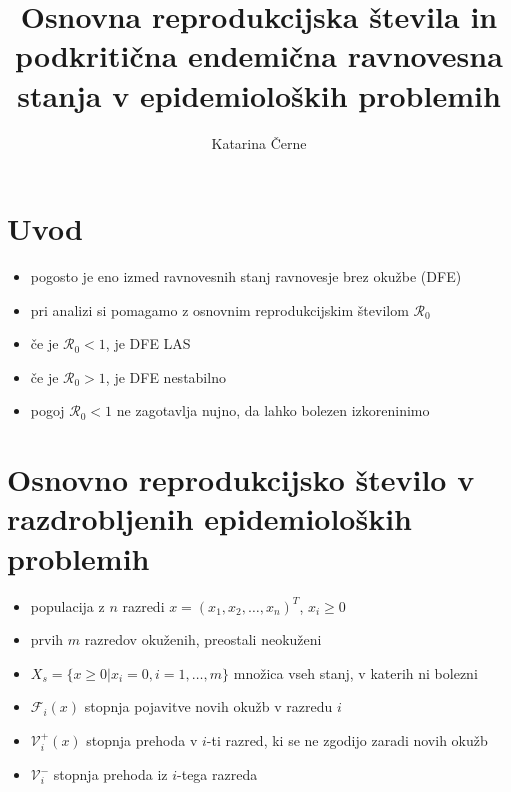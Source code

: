 \documentclass[11pt]{beamer}
\title{Osnovna reprodukcijska števila in podkritična endemična ravnovesna stanja v epidemioloških problemih}
\author{Katarina Černe}
\newcommand{\R}{\mathcal R}
\newcommand{\F}{\mathcal F}
\newcommand{\V}{\mathcal V}
\begin{document}
\begin{frame}
\maketitle
\end{frame}

\section{Uvod}
\begin{frame}
\begin{itemize}
    \item pogosto je eno izmed ravnovesnih stanj ravnovesje brez okužbe (DFE)
    \item pri analizi si pomagamo z osnovnim reprodukcijskim številom \(\R_0\)
    \item če je \(\R_0<1\), je DFE LAS
    \item če je \(\R_0>1\), je DFE nestabilno
    \item pogoj \(\R_0<1\) ne zagotavlja nujno, da lahko bolezen izkoreninimo
\end{itemize}
\end{frame}

\section{Osnovno reprodukcijsko število v razdrobljenih epidemioloških problemih}
\begin{frame}
\begin{itemize}
    \item populacija z \(n\) razredi \(x=(x_1,x_2,\ldots,x_n)^T\), \(x_i\geq 0\)
    \item prvih \(m\) razredov okuženih, preostali neokuženi
    \item \(X_s=\{x\geq 0 | x_i=0, i=1,\ldots, m\}\) množica vseh stanj, v katerih
    ni bolezni
\end{itemize}

\begin{itemize}
    \item \(\F_i(x)\) stopnja pojavitve novih okužb v razredu \(i\)
    \item \(\V^+_i(x)\) stopnja prehoda v \(i\)-ti razred, ki se ne zgodijo zaradi 
    novih okužb
    \item \(\V^-_i\) stopnja prehoda iz \(i\)-tega razreda 
\end{itemize}
\end{frame}
\end{document}
